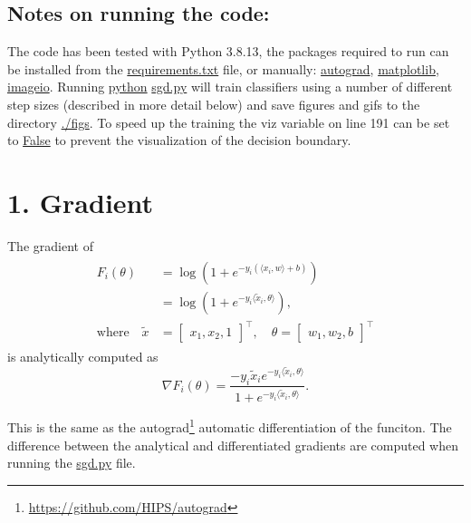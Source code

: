 \documentclass{article}
\begin{document}
\subsection*{Notes on running the code:}
The code has been tested with Python 3.8.13, the packages required to run can be installed from the \url{requirements.txt} file, or manually: \url{autograd}, \url{matplotlib}, \url{imageio}. Running \url{python} \url{sgd.py} will train classifiers using a number of different step sizes (described in more detail below) and save figures and gifs to the directory \url{./figs}. To speed up the training the viz variable on line 191 can be set to \url{False} to prevent the visualization of the decision boundary.
    \section*{1. Gradient}
    The gradient of
    \begin{align}
    \begin{split}
        F_i(\theta) &= \log(1 + e^{-y_i (\langle x_i, w \rangle + b)}) \\
        &= \log(1 + e^{-y_i \langle \tilde{x}_i, \theta \rangle}) , \\ 
        \text{where} \quad \tilde{x} &= \begin{bmatrix}
            x_1, x_2, 1
        \end{bmatrix}^\top, \quad \theta = \begin{bmatrix}
            w_1, w_2, b
        \end{bmatrix}^\top
    \end{split}
\end{align}
is analytically computed as
\begin{equation}
    \nabla F_i(\theta) = \frac{-y_i \tilde{x}_i e^{-y_i\langle \tilde{x}_i, \theta \rangle}}{1 + e^{-y_i \langle \tilde{x}_i, \theta \rangle}}.
\end{equation}

This is the same as the autograd\footnote{\url{https://github.com/HIPS/autograd}} automatic differentiation of the funciton. The difference between the analytical and differentiated gradients are computed when running the \url{sgd.py} file.
\end{document}

